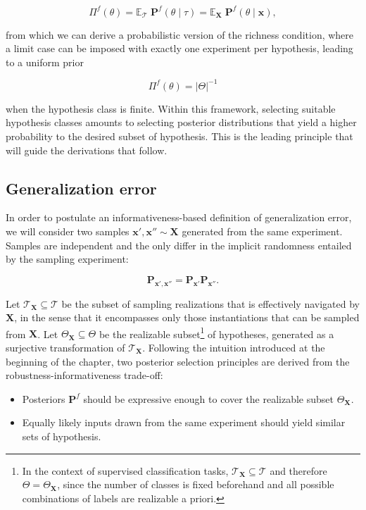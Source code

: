$$
 \Pi^f (\theta) = \mathbb{E}_{\mathcal{T}} \; \mathbf{P}^f (\theta \mid \tau) = \mathbb{E}_{\bm{X}} \; \mathbf{P}^f (\theta \mid \bm{x}),
$$

from which we can derive a probabilistic version of the richness condition, where a limit
case can be imposed with exactly one experiment per hypothesis, leading to a uniform prior

$$
\Pi^f (\theta) = |\Theta|^{-1}
$$

when the hypothesis class is finite. Within this framework, selecting suitable hypothesis classes amounts to selecting
posterior distributions that yield a higher probability to the desired subset of hypothesis. This
is the leading principle that will guide the derivations that follow.

\subsection{Generalization error}

In order to postulate an informativeness-based definition of generalization error, we will consider
two samples $\bm{x}', \bm{x}'' \sim \bm{X}$ generated from the same experiment. Samples are independent and
the only differ in the implicit randomness entailed by the sampling experiment:

$$
    \mathbf{P}_{\bm{x}', \bm{x}''} = \mathbf{P}_{\bm{x}'} \mathbf{P}_{\bm{x}''}.
$$

\begin{proposition}
    Let $\mathcal{T}_{\bm{X}} \subseteq \mathcal{T}$ be the subset of sampling realizations 
    that is effectively navigated by $\bm{X}$, in the sense that it encompasses only those instantiations
    that can be sampled from $\bm{X}$. Let $\Theta_{\bm{X}} \subseteq \Theta$ be the realizable 
    subset\footnote{
        \flushbottom In the context of supervised classification tasks, $\mathcal{T}_{\bm{X}} \subseteq \mathcal{T}$ and 
        therefore $\Theta = \Theta_{\bm{X}}$, since the number of classes
        is fixed beforehand and all possible combinations of labels are realizable a priori.
    } 
    of hypotheses, generated as a surjective transformation of $\mathcal{T}_{\bm{X}}$. Following
    the intuition introduced at the beginning of the chapter, two posterior selection principles are 
    derived from the robustness-informativeness trade-off:
    \begin{itemize}
        \item Posteriors $\mathbf{P}^f$ should be expressive enough to cover the realizable subset $\Theta_{\bm{X}}$.
        \vspace{-2.5mm}
        \item Equally likely inputs drawn from the same experiment should yield similar sets of hypothesis.
    \end{itemize}
\end{proposition}


